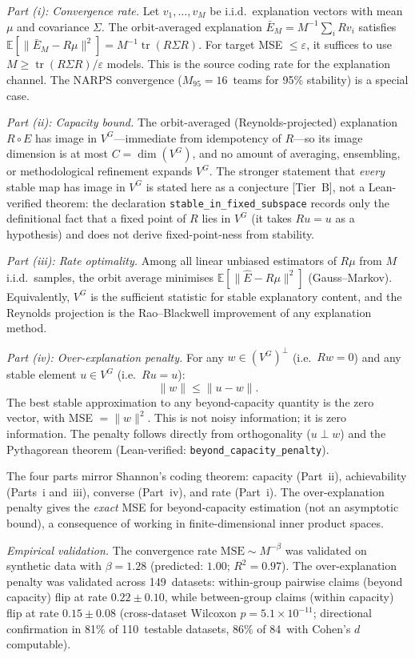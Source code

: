 \documentclass[11pt,a4paper]{article}
\begin{document}
\emph{Part (i): Convergence rate.}  Let $v_1, \ldots, v_M$ be i.i.d.\ explanation vectors with mean $\mu$ and covariance $\Sigma$.  The orbit-averaged explanation $\bar{E}_M = M^{-1} \sum_i R v_i$ satisfies
$\mathbb{E}[\|\bar{E}_M - R\mu\|^2] = M^{-1} \operatorname{tr}(R\Sigma R)$.
For target MSE $\leq \varepsilon$, it suffices to use $M \geq \operatorname{tr}(R\Sigma R)/\varepsilon$ models.  This is the source coding rate for the explanation channel.  The NARPS convergence ($M_{95} = 16$~teams for 95\% stability) is a special case.

\emph{Part (ii): Capacity bound.}  The orbit-averaged (Reynolds-projected) explanation $R \circ E$ has image in $V^G$---immediate from idempotency of $R$---so its image dimension is at most $C = \dim(V^G)$, and no amount of averaging, ensembling, or methodological refinement expands $V^G$.  The stronger statement that \emph{every} stable map has image in $V^G$ is stated here as a conjecture [Tier~B], not a Lean-verified theorem: the declaration \texttt{stable\_in\_fixed\_subspace} records only the definitional fact that a fixed point of $R$ lies in $V^G$ (it takes $Ru = u$ as a hypothesis) and does not derive fixed-point-ness from stability.

\emph{Part (iii): Rate optimality.}  Among all linear unbiased estimators of $R\mu$ from $M$ i.i.d.\ samples, the orbit average minimises $\mathbb{E}[\|\hat{E} - R\mu\|^2]$ (Gauss--Markov).  Equivalently, $V^G$ is the sufficient statistic for stable explanatory content, and the Reynolds projection is the Rao--Blackwell improvement of any explanation method.

\emph{Part (iv): Over-explanation penalty.}  For any $w \in (V^G)^\perp$ (i.e.\ $Rw = 0$) and any stable element $u \in V^G$ (i.e.\ $Ru = u$):
\[
  \|w\| \leq \|u - w\|.
\]
The best stable approximation to any beyond-capacity quantity is the zero vector, with MSE $= \|w\|^2$.  This is not noisy information; it is zero information.  The penalty follows directly from orthogonality ($u \perp w$) and the Pythagorean theorem (Lean-verified: \texttt{beyond\_capacity\_penalty}).

The four parts mirror Shannon's coding theorem: capacity (Part~ii), achievability (Parts~i and~iii), converse (Part~iv), and rate (Part~i).  The over-explanation penalty gives the \emph{exact} MSE for beyond-capacity estimation (not an asymptotic bound), a consequence of working in finite-dimensional inner product spaces.

\emph{Empirical validation.}  The convergence rate $\text{MSE} \sim M^{-\beta}$ was validated on synthetic data with $\beta = 1.28$ (predicted: $1.00$; $R^2 = 0.97$).  The over-explanation penalty was validated across 149~datasets: within-group pairwise claims (beyond capacity) flip at rate $0.22 \pm 0.10$, while between-group claims (within capacity) flip at rate $0.15 \pm 0.08$ (cross-dataset Wilcoxon $p = 5.1 \times 10^{-11}$; directional confirmation in 81\% of 110~testable datasets, 86\% of 84~with Cohen's $d$ computable).
\end{document}
